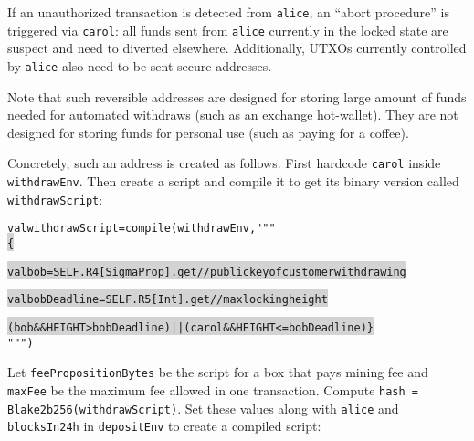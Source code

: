 \documentclass[11pt]{article}
\newcommand\Hi[2][lightgray]{%
	\hspace*{-\fboxsep}%
	\colorbox{#1}{#2}%
	\hspace*{-\fboxsep}%
}
\begin{document}
If an unauthorized transaction is detected from \texttt{alice}, an ``abort procedure'' is triggered via \texttt{carol}: all funds sent from \texttt{alice} currently in the locked state are suspect and need to diverted elsewhere. Additionally, UTXOs currently controlled by \texttt{alice} also need to be sent secure addresses. 

Note that such reversible addresses are designed for storing large amount of funds needed for automated withdraws (such as an exchange hot-wallet). They are not designed for storing funds for personal use (such as paying for a coffee). 

Concretely, such an address is created as follows. First hardcode \texttt{carol} inside \texttt{withdrawEnv}. Then create a script and compile it to get its binary version called \texttt{withdrawScript}:
\begin{alltt}
val withdrawScript = compile(withdrawEnv, """ \Hi{\{}
  \Hi{val bob         = SELF.R4[SigmaProp].get // public key of customer withdrawing}
  \Hi{val bobDeadline = SELF.R5[Int].get       // max locking height}
  \Hi{(bob && HEIGHT > bobDeadline) || (carol && HEIGHT <= bobDeadline) \}} """)
\end{alltt}

Let \texttt{feePropositionBytes} be the script for a box that pays mining fee and \texttt{maxFee} be the maximum fee allowed in one transaction. 
Compute \texttt{hash = Blake2b256(withdrawScript)}. Set these values along with \texttt{alice} and \texttt{blocksIn24h} in \texttt{depositEnv} to create a compiled script: %

%
%
%
%
\end{document}
